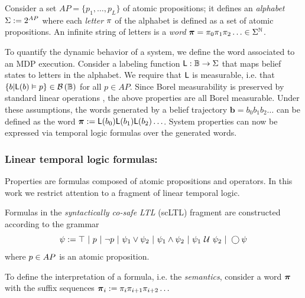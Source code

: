 \documentclass{ifacconf}
\begin{document}
Consider a set $AP = \{ p_1, \ldots, p_L \}$ of atomic propositions; it defines an \emph{alphabet} $\Sigma := 2^{AP}$ where each \emph{letter} $\pi$ of the alphabet is defined as a set of atomic propositions. An infinite string of letters is a \emph{word} ${\boldsymbol{\pi}}=\pi_0\pi_1\pi_2\ldots\in\Sigma^{\mathbb{N}}$.

To quantify the dynamic behavior of a system, we define the word associated to an MDP execution. Consider a labeling function $\mathsf{L}:\mathbb{B}\rightarrow \Sigma$ that maps belief states to letters in the alphabet. We require that $\mathsf{L}$ is measurable, i.e. that $\{b|\mathsf{L}(b)\vDash p \}\in \mathcal{B}\left(\mathbb{B}\right)$ for all $p \in AP$. Since Borel measurability is preserved by standard linear operations \citep{azoff1974borel}%
, the above properties are all Borel measurable. Under these assumptions, the words generated by a belief trajectory $\mathbf{b} = b_0 b_1 b_2 \ldots$ can be defined as the word ${\boldsymbol{\pi}}:=\mathsf{L}(b_0)\mathsf{L}(b_1) \mathsf{L}(b_2) \ldots$. System properties can now be expressed via temporal logic formulas over the generated words.

\subsubsection{Linear temporal logic formulas:}

Properties are formulas composed of atomic propositions and operators. In this work we restrict attention to a fragment of linear temporal logic.
\begin{definition}
  \label{def:gdtl-syntax}
  Formulas in the \emph{syntactically co-safe LTL} (scLTL) fragment are constructed according to the grammar
  \begin{equation*}
    \label{eq:scLTL}
    \psi :=  \True \ |\ p \ |\ \notltl p \ |\ \psi_1 \vee\psi_2  \ |\ \psi_1 \andltl \psi_2 \ |\ \psi_1 \Until \psi_2 \ |\ \Next \psi
  \end{equation*}
  where $p\in {AP}$ is an atomic proposition.
\end{definition}

To define the interpretation of a formula, i.e. the \emph{semantics}, consider a word ${\boldsymbol{\pi}}$ with the suffix sequences ${\boldsymbol{\pi}}_i:= \pi_i \pi_{i+1} \pi_{i+2} \ldots$
\end{document}
